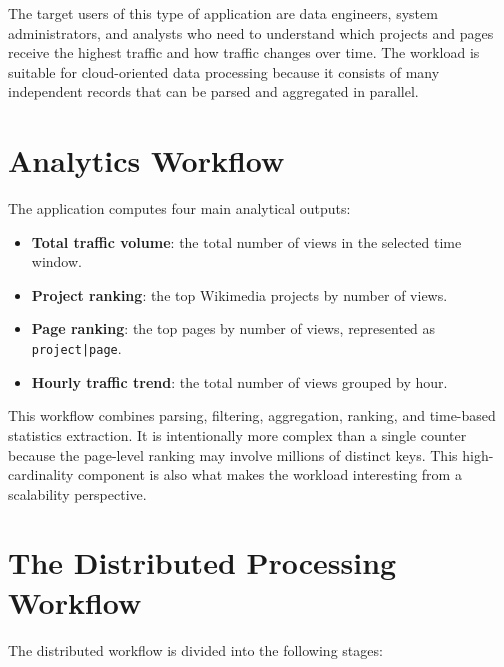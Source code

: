 \documentclass[12pt,a4paper]{report}
\begin{document}
The target users of this type of application are data engineers, system administrators, and analysts who need to understand which projects and pages receive the highest traffic and how traffic changes over time. The workload is suitable for cloud-oriented data processing because it consists of many independent records that can be parsed and aggregated in parallel.

\section{Analytics Workflow}

The application computes four main analytical outputs:

\begin{itemize}
    \item \textbf{Total traffic volume}: the total number of views in the selected time window.
    \item \textbf{Project ranking}: the top Wikimedia projects by number of views.
    \item \textbf{Page ranking}: the top pages by number of views, represented as \texttt{project|page}.
    \item \textbf{Hourly traffic trend}: the total number of views grouped by hour.
\end{itemize}

This workflow combines parsing, filtering, aggregation, ranking, and time-based statistics extraction. It is intentionally more complex than a single counter because the page-level ranking may involve millions of distinct keys. This high-cardinality component is also what makes the workload interesting from a scalability perspective.

\section{The Distributed Processing Workflow}

The distributed workflow is divided into the following stages:
\end{document}
